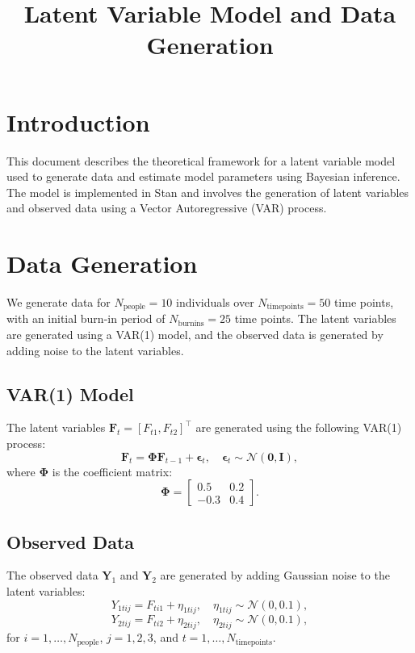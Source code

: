\documentclass{article}
\title{Latent Variable Model and Data Generation}
\author{}
\date{}
\begin{document}


\maketitle

\section{Introduction}

This document describes the theoretical framework for a latent variable model used to generate data and estimate model parameters using Bayesian inference. The model is implemented in Stan and involves the generation of latent variables and observed data using a Vector Autoregressive (VAR) process.

\section{Data Generation}

We generate data for $N_{\text{people}} = 10$ individuals over $N_{\text{timepoints}} = 50$ time points, with an initial burn-in period of $N_{\text{burnins}} = 25$ time points. The latent variables are generated using a VAR(1) model, and the observed data is generated by adding noise to the latent variables.

\subsection{VAR(1) Model}
The latent variables $\bm{F}_t = [F_{t1}, F_{t2}]^\top$ are generated using the following VAR(1) process:
\[
\bm{F}_t = \bm{\Phi} \bm{F}_{t-1} + \bm{\epsilon}_t, \quad \bm{\epsilon}_t \sim \mathcal{N}(\bm{0}, \bm{I}),
\]
where $\bm{\Phi}$ is the coefficient matrix:
\[
\bm{\Phi} = \begin{bmatrix} 0.5 & 0.2 \\ -0.3 & 0.4 \end{bmatrix}.
\]

\subsection{Observed Data}
The observed data $\bm{Y}_1$ and $\bm{Y}_2$ are generated by adding Gaussian noise to the latent variables:
\[
Y_{1tij} = F_{ti1} + \eta_{1tij}, \quad \eta_{1tij} \sim \mathcal{N}(0, 0.1),
\]
\[
Y_{2tij} = F_{ti2} + \eta_{2tij}, \quad \eta_{2tij} \sim \mathcal{N}(0, 0.1),
\]
for $i = 1, \ldots, N_{\text{people}}$, $j = 1, 2, 3$, and $t = 1, \ldots, N_{\text{timepoints}}$.
\end{document}
